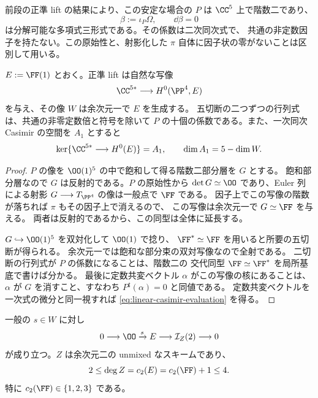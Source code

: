 前段の正準 lift の結果により、この安定な場合の $P$ は
$\CC^5$ 上で階数二であり、
\begin{equation}
 \beta:=\iota_P\Omega,\qquad \dd\beta=0
 \label{eq:canonical-beta}
\end{equation}
は分解可能な多項式三形式である。その係数は二次同次式で、
共通の非定数因子を持たない。この原始性と、射影化した
$\pi$ 自体に因子状の零がないことは区別して用いる。

\begin{lemma}
\label{lem:canonical-five-sections}
$E:=\FF(1)$ とおく。正準 lift は自然な写像
\[
 \CC^{5*}\longrightarrow H^0(\PP^4,E)
\]
を与え、その像 $W$ は余次元一で $E$ を生成する。
五切断の二つずつの行列式は、共通の非零定数倍と符号を除いて
$P$ の十個の係数である。また、一次同次 Casimir の空間を $A_1$ とすると
\begin{equation}
 \ker\{\CC^{5*}\longrightarrow H^0(E)\}=A_1,
 \qquad \dim A_1=5-\dim W.
 \label{eq:linear-casimir-evaluation}
\end{equation}
\end{lemma}

\begin{proof}
$P$ の像を $\OO(1)^5$ の中で飽和して得る階数二部分層を $G$ とする。
飽和部分層なので $G$ は反射的である。$P$ の原始性から
$\det G\simeq\OO$ であり、Euler 列による射影
$G\longrightarrow T_{\PP^4}$ の像は一般点で $\FF$ である。
因子上でこの写像の階数が落ちれば $\pi$ もその因子上で消えるので、
この写像は余次元一で $G\simeq\FF$ を与える。
両者は反射的であるから、この同型は全体に延長する。

$G\hookrightarrow\OO(1)^5$ を双対化して $\OO(1)$ で捻り、
$\FF^*\simeq\FF$ を用いると所要の五切断が得られる。
余次元一では飽和な部分束の双対写像なので全射である。
二切断の行列式が $P$ の係数になることは、階数二の
交代同型 $\FF\simeq\FF^*$ を局所基底で書けば分かる。
最後に定数共変ベクトル $\alpha$ がこの写像の核にあることは、
$\alpha$ が $G$ を消すこと、すなわち $P^\sharp(\alpha)=0$ と同値である。
定数共変ベクトルを一次式の微分と同一視すれば
\eqref{eq:linear-casimir-evaluation} を得る。
\end{proof}

\begin{lemma}
\label{lem:chern-bound-stable-rank-two}
一般の $s\in W$ に対し
\begin{equation}
 0\longrightarrow\OO\xrightarrow{s}E
 \longrightarrow\mathcal I_Z(2)\longrightarrow0
 \label{eq:section-extension}
\end{equation}
が成り立つ。$Z$ は余次元二の unmixed なスキームであり、
\begin{equation}
 2\leq\deg Z=c_2(E)=c_2(\FF)+1\leq4.
 \label{eq:chern-bound}
\end{equation}
特に $c_2(\FF)\in\{1,2,3\}$ である。
\end{lemma}


